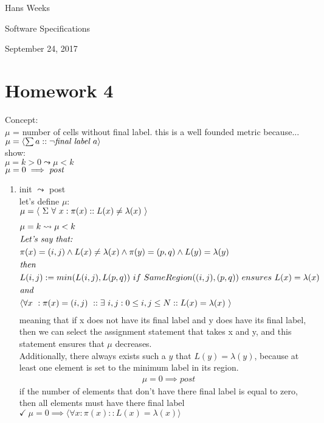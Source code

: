 \documentclass{article}
\begin{document}
\hfill Hans Weeks

\hfill Software Specifications

\hfill September 24, 2017
\section*{Homework 4}
Concept:\\ $\mu$ = number of cells without final label. this is a well founded metric because...\\
$\mu = \langle \sum a :: \neg \emph{final label } a \rangle$\\
show:\\
$\mu=k>0 \leadsto \mu<k$\\
$\mu=0\implies \emph{post}$\\
\begin{enumerate}


\item
init $\leadsto$ post\\
let's define $\mu$:\\
$\mu = \langle \ \Sigma \ \forall \ x : \pi(x) :: L(x) \neq \lambda(x) \ \rangle\\$
\begin{align*}
&\mu = k \leadsto \mu < k\\
&\emph{Let's say that:}\\
&\pi(x)=(i,j) \wedge L(x)\neq \lambda(x) \wedge \pi(y)=(p,q) \wedge L(y)=\lambda(y)\\
&\emph{then}\\
&L(i,j) := min(L(i,j),L(p,q)) \ if \ SameRegion((i,j),(p,q)) \ ensures \ L(x)=\lambda(x)\\
&\emph{and}\\
&\langle \forall x \ : \pi(x)=(i,j) \ :: \exists \ i,j : 0 \leq i,j \leq N :: L(x)=\lambda(x) \ \rangle\\
\end{align*}
meaning that if x does not have its final label and y does have its final label, then we can select the assignment statement that takes x and y, and this statement ensures that $\mu$ decreases.\\
Additionally, there always exists such a $y$ that $L(y)=\lambda(y)$, because at least one element is set to the minimum label in its region.\\

\begin{align*}
&\mu = 0 \implies post
\end{align*}
if the number of elements that don't have there final label is equal to zero, then all elements must have there final label\\
$\checkmark \ \mu = 0 \implies \langle \forall x : \pi(x) :: L(x)=\lambda(x) \rangle$\\


\end{enumerate}
\end{document}
